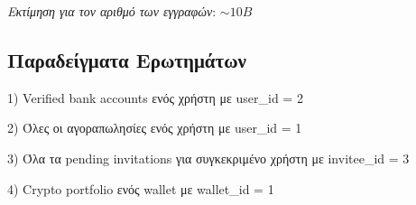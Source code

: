 \documentclass[a4paper,12pt]{article}
\begin{document}
\begin{flushright}
\textit{Εκτίμηση για τον αριθμό των εγγραφών}: $\sim10B$
\end{flushright}



\newpage



\subsection{Παραδείγματα Ερωτημάτων}

\begin{flushleft}

1) Verified bank accounts ενός χρήστη με user\_id = 2




2) Όλες οι αγοραπωλησίες ενός χρήστη με user\_id = 1



3) Όλα τα pending invitations για συγκεκριμένο χρήστη με invitee\_id = 3



4) Crypto portfolio ενός wallet με wallet\_id = 1




\end{flushleft}

\end{document}
